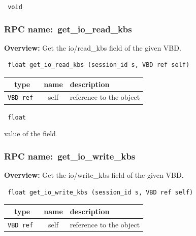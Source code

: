 \vspace{0.3cm}

{\tt 
void
}



\vspace{0.3cm}
\vspace{0.3cm}
\vspace{0.3cm}
\subsubsection{RPC name:~get\_io\_read\_kbs}

{\bf Overview:} 
Get the io/read\_kbs field of the given VBD.

\begin{verbatim} float get_io_read_kbs (session_id s, VBD ref self)\end{verbatim}



 
\vspace{0.3cm}
\begin{tabular}{|c|c|p{7cm}|}
 \hline
{\bf type} & {\bf name} & {\bf description} \\ \hline
{\tt VBD ref } & self & reference to the object \\ \hline 

\end{tabular}

\vspace{0.3cm}

{\tt 
float
}


value of the field
\vspace{0.3cm}
\vspace{0.3cm}
\vspace{0.3cm}
\subsubsection{RPC name:~get\_io\_write\_kbs}

{\bf Overview:} 
Get the io/write\_kbs field of the given VBD.

\begin{verbatim} float get_io_write_kbs (session_id s, VBD ref self)\end{verbatim}



 
\vspace{0.3cm}
\begin{tabular}{|c|c|p{7cm}|}
 \hline
{\bf type} & {\bf name} & {\bf description} \\ \hline
{\tt VBD ref } & self & reference to the object \\ \hline 

\end{tabular}

